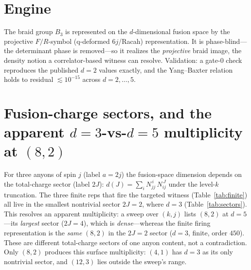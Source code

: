 \documentclass[aps,prx,reprint,amsmath,amssymb,floatfix,nofootinbib,superscriptaddress]{revtex4-2}
\begin{document}
\appendix

\section{Engine}
\label{app:engine}

The braid group $B_3$ is represented on the $d$-dimensional fusion space by the
projective $F/R$-symbol (q-deformed $6j$/Racah) representation. It is phase-blind---the
determinant phase is removed---so it realizes the \emph{projective} braid image, the
density notion a correlator-based witness can resolve. Validation: a gate-$0$ check
reproduces the published $d=2$ values exactly, and the Yang--Baxter relation holds to
residual $\lesssim 10^{-15}$ across $d = 2,\ldots,5$.

\section{Fusion-charge sectors, and the apparent $d=3$-vs-$d=5$ multiplicity at $(8,2)$}
\label{app:sectors}

For three anyons of spin $j$ (label $a = 2j$) the fusion-space dimension depends on
the total-charge sector (label $2J$): $d(J) = \sum_i N_{jj}^{\,i}\, N_{ij}^{\,J}$
under the level-$k$ truncation. The three finite reps that fire the targeted witness
(Table~\ref{tab:finite}) all live in the smallest nontrivial sector $2J = 2$, where
$d = 3$ (Table~\ref{tab:sectors}). This resolves an apparent multiplicity: a sweep
over $(k,j)$ lists $(8,2)$ at $d=5$---its \emph{largest} sector ($2J=4$), which is
\emph{dense}---whereas the finite firing representation is the \emph{same} $(8,2)$ in
the $2J=2$ sector ($d=3$, finite, order $450$). These are different total-charge
sectors of one anyon content, not a contradiction. Only $(8,2)$ produces this surface
multiplicity: $(4,1)$ has $d=3$ as its only nontrivial sector, and $(12,3)$ lies
outside the sweep's range.

\begin{table}[b]
\caption{Fusion-space dimension by total-charge sector $\{2J : d\}$ for the three
finite families, and the finite $d=3$ representation each contributes at $2J=2$.}
\label{tab:sectors}
\centering
{}
\end{table}
\end{document}
